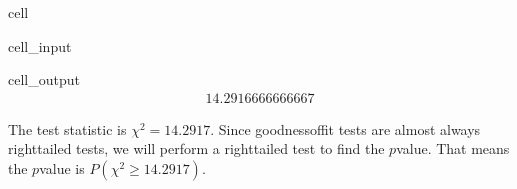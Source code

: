 \documentclass[letterpaper,10pt,english]{jupyterBook}
\begin{document}
\begin{sphinxuseclass}{cell}\begin{sphinxVerbatimInput}

\begin{sphinxuseclass}{cell_input}
\begin{sphinxVerbatim}[commandchars=\\\{\}]

\end{sphinxVerbatim}

\end{sphinxuseclass}\end{sphinxVerbatimInput}
\begin{sphinxVerbatimOutput}

\begin{sphinxuseclass}{cell_output}\begin{equation*}
\begin{split}14.2916666666667\end{split}
\end{equation*}
\end{sphinxuseclass}\end{sphinxVerbatimOutput}

\end{sphinxuseclass}
\sphinxAtStartPar
The test statistic is \(\chi^2 = 14.2917\). Since goodness\sphinxhyphen{}of\sphinxhyphen{}fit tests are almost always right\sphinxhyphen{}tailed tests, we will perform a right\sphinxhyphen{}tailed test to find the \(p\)\sphinxhyphen{}value. That means the \(p\)\sphinxhyphen{}value is \(P(\chi^2 \geq 14.2917)\).
\end{document}
